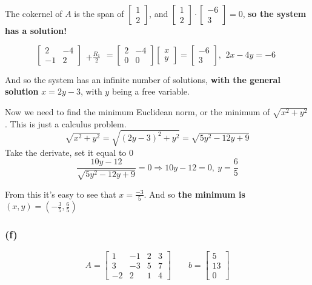 \documentclass[10pt,letterpaper]{article}
\begin{document}
	The cokernel of $A$ is the span of $\begin{bmatrix}
	1 \\ 2
	\end{bmatrix}$, and $\begin{bmatrix}
	1 \\ 2 
	\end{bmatrix} \cdot \begin{bmatrix}
	-6 \\ 3
	\end{bmatrix} = 0$, \textbf{so the system has a solution! }
	
	$$
	\begin{bmatrix}
	2 & -4 \\ -1 & 2
	\end{bmatrix} \begin{array}{c}
	\\ +\frac{R_1}{2}
	\end{array} = \begin{bmatrix}
	2 & -4 \\ 0 & 0 
	\end{bmatrix} \begin{bmatrix}
	x \\ y
	\end{bmatrix} = \begin{bmatrix}
	-6 \\ 3
	\end{bmatrix}, \begin{array}{c}
	2x - 4y = -6
	\end{array}
	$$
	
	And so the system has an infinite number of solutions, \textbf{with the general solution} $x = 2y -3$, with $y$ being a free variable. 
	
	Now we need to find the minimum Euclidean norm, or the minimum of $\sqrt{x^2 + y^2}$. This is just a calculus problem. 
	$$
	\sqrt{x^2 + y^2} = \sqrt{(2y -3 )^2 + y^2} = \sqrt{5y^2 -12y + 9}
	$$
	Take the derivate, set it equal to 0
	$$
	\frac{10y - 12}{\sqrt{5y^2 -12y + 9}} = 0 \Rightarrow 10y - 12 = 0, \: y = \frac{6}{5}
	$$
	
	From this it's easy to see that $x = \frac{-3}{5}$. And so \textbf{the minimum is } $\boxed{(x,y) = (-\frac{3}{5}, \frac{6}{5})}$
	\subsubsection*{(f)}
	$$
	A = \begin{bmatrix}
	1 & -1 & 2 & 3 \\ 3 & -3 & 5 & 7 \\ -2 & 2 & 1 & 4
	\end{bmatrix} \qquad b = \begin{bmatrix}
	5 \\ 13 \\ 0
	\end{bmatrix}
	$$
	
\end{document}
